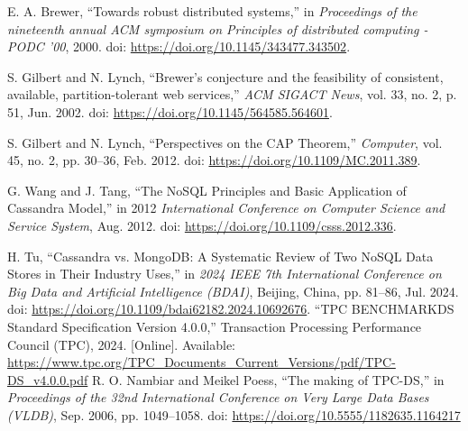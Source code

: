 \documentclass[conference]{IEEEtran}
\begin{document}
\begin{thebibliography}{00}
     E. A. Brewer, ``Towards robust distributed systems,'' in \textit{Proceedings of the nineteenth annual ACM symposium on Principles of distributed computing - PODC ’00}, 2000. doi: \url{https://doi.org/10.1145/343477.343502}.

     S. Gilbert and N. Lynch, ``Brewer’s conjecture and the feasibility of consistent, available, partition-tolerant web services,'' \textit{ACM SIGACT News}, vol. 33, no. 2, p. 51, Jun. 2002. doi: \url{https://doi.org/10.1145/564585.564601}.

     S. Gilbert and N. Lynch, ``Perspectives on the CAP Theorem,'' \textit{Computer}, vol. 45, no. 2, pp. 30--36, Feb. 2012. doi: \url{https://doi.org/10.1109/MC.2011.389}.

     G. Wang and J. Tang, ``The NoSQL Principles and Basic Application of Cassandra Model,'' in 2012 \textit{International Conference on Computer Science and Service System}, Aug. 2012. doi: \url{https://doi.org/10.1109/csss.2012.336}.

     H. Tu, ``Cassandra vs. MongoDB: A Systematic Review of Two NoSQL Data Stores in Their Industry Uses,'' in \textit{2024 IEEE 7th International Conference on Big Data and Artificial Intelligence (BDAI)}, Beijing, China, pp. 81--86, Jul. 2024. doi: \url{https://doi.org/10.1109/bdai62182.2024.10692676}.
     ``TPC BENCHMARK\texttrademark DS Standard Specification Version 4.0.0,''
    Transaction Processing Performance Council (TPC), 2024. [Online]. Available: \url{https://www.tpc.org/TPC_Documents_Current_Versions/pdf/TPC-DS_v4.0.0.pdf}
     R. O. Nambiar and Meikel Poess, ``The making of TPC-DS,''
    in \textit{Proceedings of the 32nd International Conference on Very Large Data Bases (VLDB)}, Sep. 2006, pp. 1049--1058.
    doi: \url{https://doi.org/10.5555/1182635.1164217}
\end{thebibliography}
\end{document}
